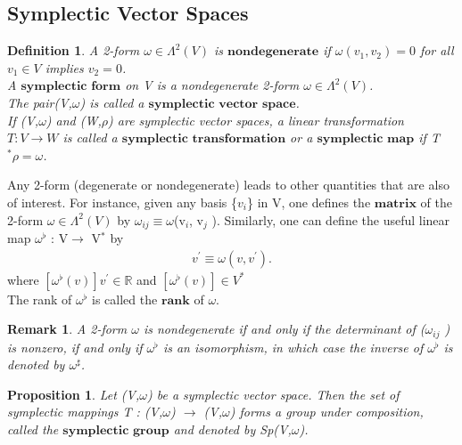 \documentclass[12pt,a4paper]{article}
\newtheorem{rem}[thm]{Remark}
\newtheorem{defn}[thm]{Definition}
\newtheorem{prop}{Proposition}
\begin{document}
\subsection{Symplectic Vector Spaces}

\begin{defn}
A 2-form $\omega \in \Lambda^{2}(V)$ is $\textbf{nondegenerate}$ if $\omega(v_1, v_2) = 0$ for all $v_1 \in V$ implies $v_2 = 0$. \\A $\textbf{symplectic form}$ on V is a nondegenerate
2-form $\omega \in \Lambda^{2}(V)$. \\The pair(V,$\omega$) is called a $\textbf{symplectic vector space}$.\\
If (V,$\omega$) and (W,$\rho$) are symplectic vector spaces, a linear transformation $T:V \to W$ is called a $\textbf{symplectic transformation}$ or a $\textbf{symplectic map}$ if T$^* \rho = \omega$.
\end{defn}

Any 2-form (degenerate or nondegenerate) leads to other quantities that
are also of interest. For instance, given any basis \{$v_i$\} in V, one defines the
$\textbf{matrix}$ of the 2-form $\omega \in \Lambda^{2}(V)$ by $\omega_{ij} \equiv \omega$(v$_i$, v$_j$ ). Similarly, one can
define the useful linear map $\omega^{\flat}$ : V$\to$ V$^*$ by
\begin{eqnarray*}
 [ \omega^{\flat} (v) ] v^{'} \equiv \omega(v, v^{'}).
\end{eqnarray*}
\indent where $ [ \omega^{\flat} (v) ] v^{'} \in \mathbb{R}$ and  $ [ \omega^{\flat} (v) ] \in V^{*}$\\
The rank of $\omega^{\flat}$ is called the $\textbf{rank}$ of $\omega$.
\begin{rem}
A 2-form $\omega$ is nondegenerate if and only if the determinant of ($\omega_{ij}$ ) is nonzero, if and only if $\omega^{\flat}$ is an isomorphism, in which
case the inverse of $\omega^{\flat}$ is denoted by $\omega^{\sharp}$.
\end{rem}
\begin{prop}
Let (V,$\omega$) be a symplectic vector space. Then the set of
symplectic mappings T : (V,$\omega$) $\to$ (V,$\omega$) forms a group under composition,
called the $\textbf{symplectic group}$ and denoted by Sp(V,$\omega$).
\end{prop}
\end{document}
